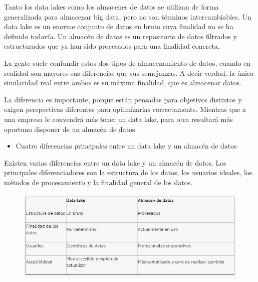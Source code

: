 \documentclass[preprint,12pt]{elsarticle}
\begin{document}
Tanto los data lakes como los almacenes de datos se utilizan de forma generalizada para almacenar big data, pero no son términos intercambiables. Un data lake es un enorme conjunto de datos en bruto cuya finalidad no se ha definido todavía. Un almacén de datos es un repositorio de datos filtrados y estructurados que ya han sido procesados para una finalidad concreta.

La gente suele confundir estos dos tipos de almacenamiento de datos, cuando en realidad son mayores sus diferencias que sus semejanzas. A decir verdad, la única similaridad real entre ambos es su máxima finalidad, que es almacenar datos.

La diferencia es importante, porque están pensadas para objetivos distintos y exigen perspectivas diferentes para optimizarlas correctamente. Mientras que a una empresa le convendrá más tener un data lake, para otra resultará más oportuno disponer de un almacén de datos.


\begin{itemize}

\item Cuatro diferencias principales entre un data lake y un almacén de datos
\end{itemize}

Existen varias diferencias entre un data lake y un almacén de datos. Los principales diferenciadores son la estructura de los datos, los usuarios ideales, los métodos de procesamiento y la finalidad general de los datos.

\begin{figure}[htb]
				\begin{center}
					\includegraphics[width=15cm]{./IMAGENES/fiorella4}
				\end{center}
			\end{figure}
\end{document}
